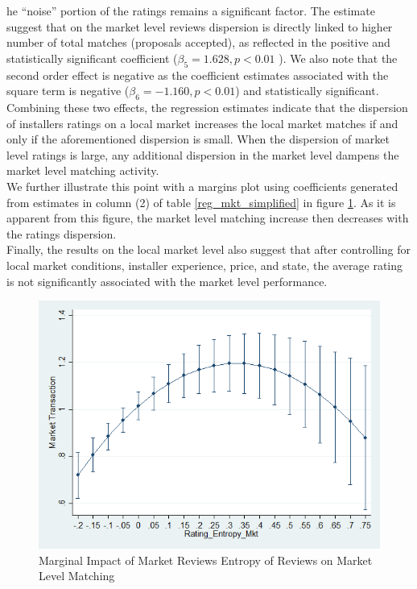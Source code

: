 \documentclass[msom,blindrev]{informs3}
\begin{document}
he ``noise'' portion of the ratings remains a significant factor. The estimate suggest that on the market level reviews dispersion is directly linked to higher number of total matches (proposals accepted), as reflected in the positive and statistically significant coefficient ($\beta_{5}=1.628,p<0.01$ ). We also note that the second order effect is negative as the coefficient estimates associated with the square term is negative ($\beta_{6}=-1.160,p<0.01$) and statistically significant. Combining these two effects, the regression estimates indicate that the dispersion of installers ratings on a local market increases the local market matches if and only if the aforementioned dispersion is small. When the dispersion of market level ratings is large, any additional dispersion in the market level dampens the market level matching activity.\\
We further illustrate this point with a margins plot using coefficients generated from estimates in column (2) of table \ref{reg_mkt_simplified} in figure \ref{fig: marginsplot_mkt_entmkt}. As it is apparent from this figure, the market level matching increase then decreases with the ratings dispersion.\\

Finally, the results on the local market level also suggest that after controlling for local market conditions, installer experience, price, and state, the average rating is not significantly associated with the market level performance.
\begin{figure}
	\centering
	\includegraphics[width=0.7\linewidth]{marginsplot_entmkt.png}
	\caption{Marginal Impact of Market Reviews Entropy of Reviews on Market Level Matching}
	\label{fig: marginsplot_mkt_entmkt}
\end{figure}
\end{document}
